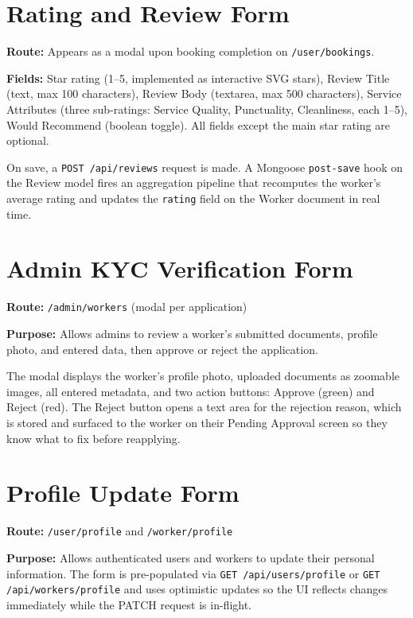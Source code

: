 \documentclass[12pt,a4paper]{report}
\begin{document}
\section{Rating and Review Form}

\textbf{Route:} Appears as a modal upon booking completion on \texttt{/user/bookings}.

\textbf{Fields:} Star rating (1–5, implemented as interactive SVG stars), Review Title (text, max 100 characters), Review Body (textarea, max 500 characters), Service Attributes (three sub-ratings: Service Quality, Punctuality, Cleanliness, each 1--5), Would Recommend (boolean toggle). All fields except the main star rating are optional.

On save, a \texttt{POST /api/reviews} request is made. A Mongoose \texttt{post-save} hook on the Review model fires an aggregation pipeline that recomputes the worker's average rating and updates the \texttt{rating} field on the Worker document in real time.

\section{Admin KYC Verification Form}

\textbf{Route:} \texttt{/admin/workers} (modal per application)

\textbf{Purpose:} Allows admins to review a worker's submitted documents, profile photo, and entered data, then approve or reject the application.

The modal displays the worker's profile photo, uploaded documents as zoomable images, all entered metadata, and two action buttons: Approve (green) and Reject (red). The Reject button opens a text area for the rejection reason, which is stored and surfaced to the worker on their Pending Approval screen so they know what to fix before reapplying.

\section{Profile Update Form}

\textbf{Route:} \texttt{/user/profile} and \texttt{/worker/profile}

\textbf{Purpose:} Allows authenticated users and workers to update their personal information. The form is pre-populated via \texttt{GET /api/users/profile} or \texttt{GET /api/workers/profile} and uses optimistic updates so the UI reflects changes immediately while the PATCH request is in-flight.
\end{document}
